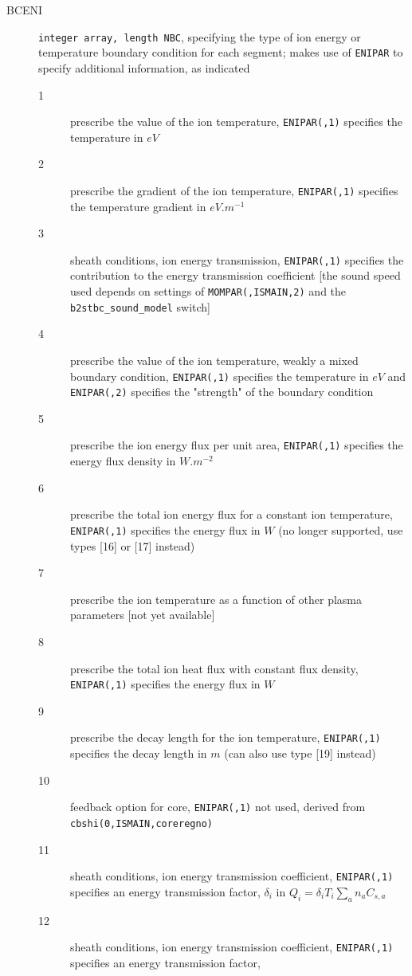 \documentclass[a4paper,10pt]{report}
\begin{document}
\begin{description}
\item[BCENI] {\tt integer array, length NBC}, specifying the
  type of ion energy or temperature boundary condition for each
  segment; makes use of {\tt ENIPAR} to specify additional
  information, as indicated
  \begin{description}
  \item[1] prescribe the value of the ion temperature,
  {\tt ENIPAR(,1)} specifies the temperature in $eV$
  \item[2] prescribe the gradient of the ion temperature,
  {\tt ENIPAR(,1)} specifies the temperature gradient in $eV.m^{-1}$
  \item[3] sheath conditions, ion energy transmission,
  {\tt ENIPAR(,1)} specifies the contribution to the energy
  transmission coefficient [the sound speed used depends on settings
  of {\tt MOMPAR(,ISMAIN,2)} and the {\tt \allowbreak b2stbc\_sound\_model} switch]
  \item[4] prescribe the value of the ion temperature, weakly a mixed
  boundary condition, {\tt ENIPAR(,1)} specifies the temperature in
  $eV$ and {\tt ENIPAR(,2)} specifies the "strength" of the
  boundary condition
  \item[5] prescribe the ion energy flux per unit area,
  {\tt ENIPAR(,1)} specifies the energy flux density in $W.m^{-2}$
  \item[6] prescribe the total ion energy flux for a constant ion
  temperature, {\tt ENIPAR(,1)} specifies the energy flux in $W$
  (no longer supported, use types [16] or [17] instead)
  \item[7] prescribe the ion temperature as a function of other plasma
  parameters [not yet available]
  \item[8] prescribe the total ion heat flux with constant flux
  density, {\tt ENIPAR(,1)} specifies the energy flux in $W$
  \item[9] prescribe the decay length for the ion temperature,
  {\tt ENIPAR(,1)} specifies the decay length in $m$ (can also use type [19] instead)
  \item[10] feedback option for core, {\tt ENIPAR(,1)} not used,
  derived from {\tt cbshi(0,ISMAIN,coreregno)}
  \item[11] sheath conditions, ion energy transmission coefficient,
  {\tt ENIPAR(,1)} specifies an energy transmission factor,
  $\delta_i$ in $Q_i = \delta_i T_i \sum_a n_a C_{s,a}$
  \item[12] sheath conditions, ion energy transmission coefficient,
  {\tt ENIPAR(,1)} specifies an energy transmission factor,

\end{description}
\end{description}
\end{document}
